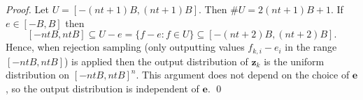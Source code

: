 \documentclass{llncs}
\newcommand{\e}{\mathbf{e}}
\newcommand{\z}{\mathbf{z}}
\begin{document}
\begin{proof}
Let $U = [-(nt+1)B, (nt+1)B]$. Then $\#U = 2(nt + 1)B + 1$.
If $e \in [-B, B]$ then 
\[
    [-ntB, ntB] \subseteq  U - e = \{ f - e : f \in U \} \subseteq [-(nt+2)B, (nt+2)B ].
\]
Hence, when rejection sampling (only outputting values $f_{k,i} - e_i$ in the range $[-ntB, ntB]$) is applied then the output distribution of $\z_k$ is the uniform distribution on $[-ntB, ntB]^n$.
This argument does not depend on the choice of $\e$, so the output distribution is independent of $\e$. \qed
\end{proof}












\end{document}

